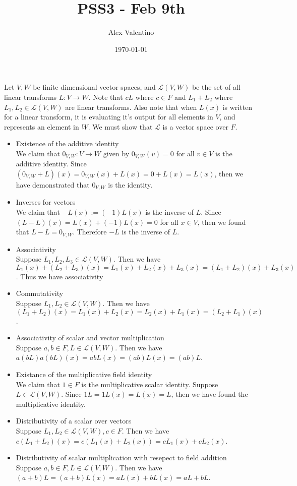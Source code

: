 \documentclass[12pt, letterpaper]{article}
\date{\today}
\author{Alex Valentino}
\title{PSS3 - Feb 9th}
\begin{document}
	Let $V,W$ be finite dimensional vector spaces, and $\mathcal{L}(V,W)$ be the set of all linear transforms $L: V \to W$.  Note that $cL$ where $c \in F$ and $L_1 + L_2$ where $L_1, L_2 \in\mathcal{L}(V,W) $ are linear transforms.  Also note that when $L(x)$ is written for a linear transform, it is evaluating it's output for all elements in $V$, and represents an element in $W$.  We must show that $\mathcal{L}$ is a vector space over $F$.  
	\begin{itemize}
		\item Existence of the additive identity\\
		We claim that $0_{V,W}: V \to W$ given by $0_{V,W}(v) = 0$ for all $v \in V$ is the additive identity. Since $(0_{V,W} + L) (x) = 0_{V,W}(x) + L(x) = 0 + L(x) = L(x)$, then we have demonstrated that $0_{V,W}$ is the identity.  
		\item Inverses for vectors\\
		We claim that $-L(x) := (-1)L(x)$ is the inverse of $L$.  Since $(L-L) (x) = L(x) + (-1) L(x) = 0$ for all $x \in V$, then we found that $L-L  =0_{V,W}$.  Therefore $-L$ is the inverse of $L$.
		\item Associativity\\
		Suppose $L_1, L_2, L_3 \in \mathcal{L}(V,W)$.  Then we have $L_1(x) + (L_2 + L_3)(x) = L_1(x) + L_2(x) + L_3(x) = (L_1 + L_2)(x) + L_3(x)$.  Thus we have associativity
		\item Commutativity\\
		Suppose $L_1, L_2 \in \mathcal{L}(V,W)$.  Then we have $(L_1+L_2)(x) = L_1(x) + L_2(x) = L_2(x) + L_1(x) = (L_2 + L_1)(x)$.
		\item Associativity of scalar and vector multiplication\\
		Suppose $a,b \in F, L \in \mathcal{L}(V,W)$.  Then we have $a(bL)  a(bL)(x) = a b L(x) = (ab) L(x) = (ab)L$.
		\item Existance of the multiplicative field identity\\
		We claim that $1\in F$ is the multiplicative scalar identity.  Suppose $L \in  \mathcal{L}(V,W)$.  Since $1L = 1 L(x) = L(x) = L$, then we have found the multiplicative identity.  
		\item Distributivity of a scalar over vectors\\
		
		Suppose $L_1, L_2 \in \mathcal{L}(V,W), c \in F$.  Then we have $c(L_1 + L_2)(x) = c(L_1(x) + L_2(x)) = cL_1(x) + cL_2(x)$.
		\item Distributivity of scalar multiplication with resepect to field addition\\
		Suppose $a,b \in F, L \in \mathcal{L}(V,W)$.  Then we have $(a+b)L = (a+b)L(x) = aL(x) + bL(x) = aL + bL$.  
	\end{itemize}	 
\end{document}

